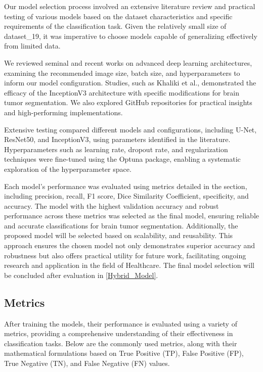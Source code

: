 Our model selection process involved an extensive literature review and practical testing of various models based on the dataset characteristics and specific requirements of the classification task. Given the relatively small size of dataset\_19, it was imperative to choose models capable of generalizing effectively from limited data.

We reviewed seminal and recent works on advanced deep learning architectures, examining the recommended image size, batch size, and hyperparameters to inform our model configuration. Studies, such as Khaliki et al., demonstrated the efficacy of the InceptionV3 architecture with specific modifications for brain tumor segmentation. We also explored GitHub repositories for practical insights and high-performing implementations.

Extensive testing compared different models and configurations, including U-Net, ResNet50, and InceptionV3, using parameters identified in the literature. Hyperparameters such as learning rate, dropout rate, and regularization techniques were fine-tuned using the Optuna package, enabling a systematic exploration of the hyperparameter space.

Each model's performance was evaluated using metrics detailed in the  section, including precision, recall, F1 score, Dice Similarity Coefficient, specificity, and accuracy. The model with the highest validation accuracy and robust performance across these metrics was selected as the final model, ensuring reliable and accurate classifications for brain tumor segmentation. Additionally, the proposed model will be selected based on scalability, and reusability. This approach ensures the chosen model not only demonstrates superior accuracy and robustness but also offers practical utility for future work, facilitating ongoing research and application in the field of Healthcare. The final model selection will be concluded after evaluation in \ref{Hybrid_Model}.

\subsection{Metrics}\label{metrics}

After training the models, their performance is evaluated using a variety of metrics, providing a comprehensive understanding of their effectiveness in classification tasks. Below are the commonly used metrics, along with their mathematical formulations based on True Positive (TP), False Positive (FP), True Negative (TN), and False Negative (FN) values.

